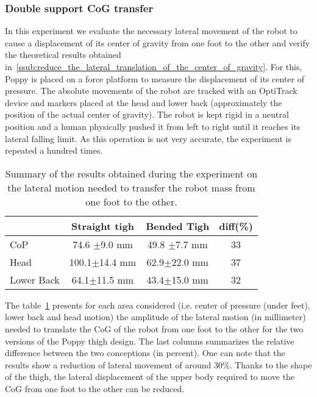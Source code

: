 

\subsubsection{Double support CoG transfer} %
\label{sub:cog_motion}


In this experiment we evaluate the necessary lateral movement of the robot to cause a displacement
of its center of gravity from one foot to the other and verify the theoretical results obtained
in~\ref{ssub:reduce_the_lateral_translation_of_the_center_of_gravity}.
For this, Poppy is placed on
a force platform to measure the displacement of its center of pressure.
The absolute movements of
the robot are tracked with an OptiTrack device and markers placed at the head and lower back
(approximately the position of the actual center of gravity).
The robot is kept rigid in a neutral
position and a human physically pushed it from left to right until it reaches its lateral falling limit.
As this operation is not very accurate, the experiment is repeated a hundred times.

\begin{table}[h]
\centering
\begin{tabular}{|l|c|c|c|}
  \hline &      Straight tigh &                     Bended Tigh &                   diff(\%) \\
  \hline CoP & 74.6 {\scriptsize$\pm$9.0} mm &     49.8 {\scriptsize$\pm$7.7} mm & 33\\
  Head & 100.1{\scriptsize$\pm$14.4} mm&     62.9{\scriptsize$\pm$22.0} mm &  37\\
  Lower Back & 64.1{\scriptsize$\pm$11.5} mm&      43.4{\scriptsize$\pm$15.0} mm &  32 \\
  \hline
\end{tabular}
\caption{Summary of the results obtained during the experiment on the lateral motion needed to transfer the robot mass from one foot to the other.}
\label{tab:CoG_motion}
\end{table}

The table~\ref{tab:CoG_motion} presents for each area considered (i.e.
center of pressure (under feet), lower back and head motion) the amplitude of the lateral motion (in millimeter) needed to translate the CoG of the robot from one foot to the other for the two versions of the Poppy thigh design.
The last columns summarizes the relative difference between the two conceptions (in percent).
One can note that the results show a reduction of lateral movement of around 30\%.
Thanks to the shape of the thigh, the lateral displacement of the upper body required to move the CoG from one foot to the other can be reduced.



